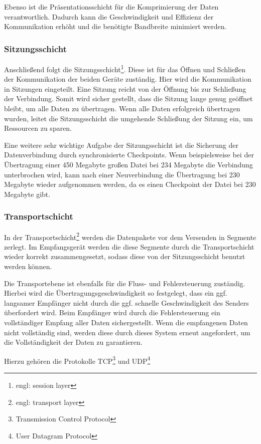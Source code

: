 \documentclass[12pt]{article}
\begin{document}
	Ebenso ist die Präsentationsschicht für die Komprimierung der Daten verantwortlich. Dadurch kann die Geschwindigkeit und Effizienz der Kommunikation erhöht und die benötigte Bandbreite minimiert werden.

\subsubsection{Sitzungsschicht}
	Anschließend folgt die Sitzungsschicht\footnote{engl: session layer}. Diese ist für das Öffnen und Schließen der Kommunikation der beiden Geräte zuständig. Hier wird die Kommunikation in Sitzungen eingeteilt. Eine Sitzung reicht von der Öffnung bis zur Schließung der Verbindung. Somit wird sicher gestellt, dass die Sitzung lange genug geöffnet bleibt, um alle Daten zu übertragen. Wenn alle Daten erfolgreich übertragen wurden, leitet die Sitzungsschicht die umgehende Schließung der Sitzung ein, um Ressourcen zu sparen. 
	
	Eine weitere sehr wichtige Aufgabe der Sitzungsschicht ist die Sicherung der Datenverbindung durch synchronisierte Checkpoints. Wenn beispielsweise bei der Übertragung einer 450 Megabyte großen Datei bei 234 Megabyte die Verbindung unterbrochen wird, kann nach einer Neuverbindung die Übertragung bei 230 Megabyte wieder aufgenommen werden, da es einen Checkpoint der Datei bei 230 Megabyte gibt.

\subsubsection{Transportschicht}
	In der Transportschicht\footnote{engl: transport layer} werden die Datenpakete vor dem Versenden in Segmente zerlegt. Im Empfangsgerät werden die diese Segmente durch die Transportschicht wieder korrekt zusammengesetzt, sodass diese von der Sitzungsschicht benutzt werden können. 
	
	Die Transportebene ist ebenfalls für die Fluss- und Fehlersteuerung zuständig. Hierbei wird die Übertragungsgeschwindigkeit so festgelegt, dass ein ggf. langsamer Empfänger nicht durch die ggf. schnelle Geschwindigkeit des Senders überfordert wird. Beim Empfänger wird durch die Fehlersteuerung ein vollständiger Empfang aller Daten sichergestellt. Wenn die empfangenen Daten nicht vollständig sind, werden diese durch dieses System erneut angefordert, um die Vollständigkeit der Daten zu garantieren. 
	
	Hierzu gehören die Protokolle TCP\footnote{Transmission Control Protocol} und UDP\footnote{User Datagram Protocol}
\end{document}
